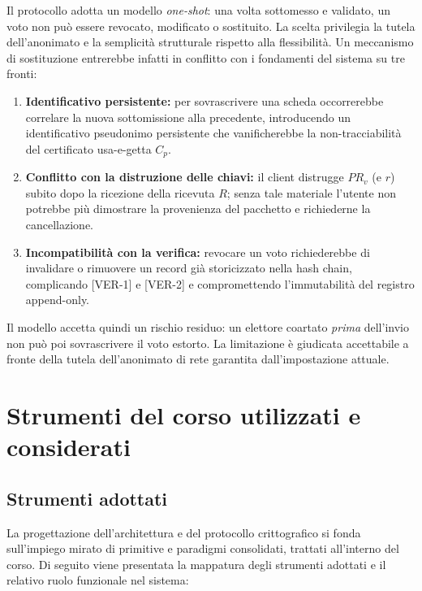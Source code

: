 Il protocollo adotta un modello \textit{one-shot}: una volta sottomesso e validato, un voto non può essere revocato, modificato o sostituito. La scelta privilegia la tutela dell'anonimato e la semplicità strutturale rispetto alla flessibilità. Un meccanismo di sostituzione entrerebbe infatti in conflitto con i fondamenti del sistema su tre fronti:
\begin{enumerate}
    \item \textbf{Identificativo persistente:} per sovrascrivere una scheda occorrerebbe correlare la nuova sottomissione alla precedente, introducendo un identificativo pseudonimo persistente che vanificherebbe la non-tracciabilità del certificato usa-e-getta $C_p$.
    \item \textbf{Conflitto con la distruzione delle chiavi:} il client distrugge $PR_v$ (e $r$) subito dopo la ricezione della ricevuta $R$; senza tale materiale l'utente non potrebbe più dimostrare la provenienza del pacchetto e richiederne la cancellazione.
    \item \textbf{Incompatibilità con la verifica:} revocare un voto richiederebbe di invalidare o rimuovere un record già storicizzato nella hash chain, complicando [VER-1] e [VER-2] e compromettendo l'immutabilità del registro append-only.
\end{enumerate}
Il modello accetta quindi un rischio residuo: un elettore coartato \textit{prima} dell'invio non può poi sovrascrivere il voto estorto. La limitazione è giudicata accettabile a fronte della tutela dell'anonimato di rete garantita dall'impostazione attuale.


\section{Strumenti del corso utilizzati e considerati}
\label{sec:strumenti_corso}

\subsection{Strumenti adottati}
\label{subsec:wp2_strumenti_adottati}

La progettazione dell'architettura e del protocollo crittografico si fonda sull'impiego mirato di primitive e paradigmi consolidati, trattati all'interno del corso. Di seguito viene presentata la mappatura degli strumenti adottati e il relativo ruolo funzionale nel sistema:


